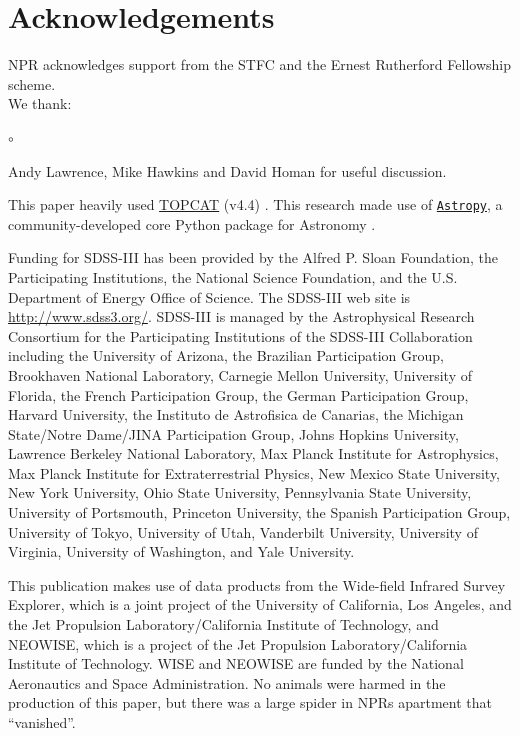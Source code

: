 \documentclass[a4paper,fleqn,usenatbib]{mnras}
\begin{document}
\section*{Acknowledgements}
NPR acknowledges support from the STFC and the Ernest Rutherford Fellowship scheme. 
\\

\noindent
We thank:
\begin{list}{$\circ$}{}  
  \item Andy Lawrence, Mike Hawkins and David Homan for useful discussion. 
\end{list}

This paper heavily used \href{http://www.star.bris.ac.uk/~mbt/topcat/}{TOPCAT} (v4.4)
\citep[][]{Taylor2005, Taylor2011}.
This research made use of \href{http://www.astropy.org}{\tt Astropy}, 
a community-developed core Python package for Astronomy 
\citep{AstropyCollaboration2013, AstropyCollaboration2018}.

Funding for SDSS-III has been provided by the Alfred P. Sloan
Foundation, the Participating Institutions, the National Science
Foundation, and the U.S. Department of Energy Office of Science. The
SDSS-III web site is
\href{http://www.sdss3.org/}{http://www.sdss3.org/}.
SDSS-III is managed by the Astrophysical Research Consortium for the
Participating Institutions of the SDSS-III Collaboration including the
University of Arizona, the Brazilian Participation Group, Brookhaven
National Laboratory, Carnegie Mellon University, University of
Florida, the French Participation Group, the German Participation
Group, Harvard University, the Instituto de Astrofisica de Canarias,
the Michigan State/Notre Dame/JINA Participation Group, Johns Hopkins
University, Lawrence Berkeley National Laboratory, Max Planck
Institute for Astrophysics, Max Planck Institute for Extraterrestrial
Physics, New Mexico State University, New York University, Ohio State
University, Pennsylvania State University, University of Portsmouth,
Princeton University, the Spanish Participation Group, University of
Tokyo, University of Utah, Vanderbilt University, University of
Virginia, University of Washington, and Yale University.

This publication makes use of data products from the Wide-field
Infrared Survey Explorer, which is a joint project of the University
of California, Los Angeles, and the Jet Propulsion
Laboratory/California Institute of Technology, and NEOWISE, which is a
project of the Jet Propulsion Laboratory/California Institute of
Technology. WISE and NEOWISE are funded by the National Aeronautics
and Space Administration. No animals were harmed in the production of
this paper, but there was a large spider in NPRs apartment that
``vanished''.





\bsp	%
\label{lastpage}
\end{document}
